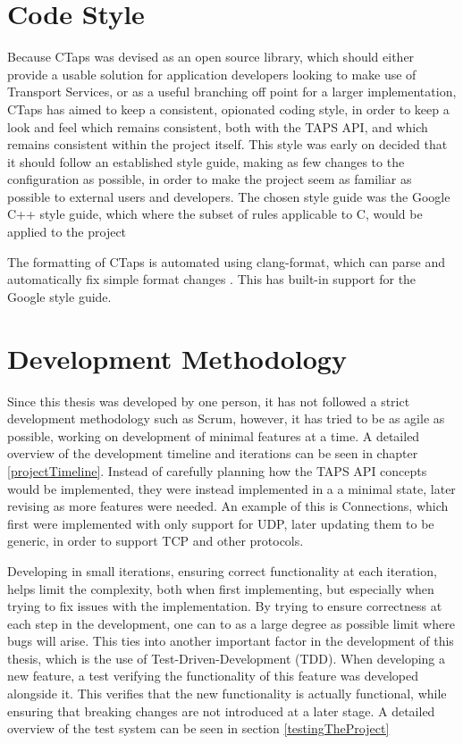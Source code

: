 \section{Code Style}
Because CTaps was devised as an open source library, which
should either provide a usable solution for application
developers looking to make use of Transport Services, or as
a useful branching off point for a larger implementation, CTaps has aimed
to keep a consistent, opionated coding style, in order to keep a look and
feel which remains consistent, both with the TAPS API, and which remains
consistent within the project itself. This style was early on decided that
it should follow an established style guide, making as few changes to the configuration
as possible, in order to make the project seem as familiar as possible to external
users and developers. The chosen style guide was the Google C++ style guide, which
where the subset of rules applicable to C, would be applied to the project \cite{googleGoogleStyleGuide}

The formatting of CTaps is automated using clang-format, which can parse
and automatically fix simple format changes . This has built-in
support for the Google style guide. 

\section{Development Methodology} \label{developmentMethodology}
Since this thesis was developed by one person, it has not
followed a strict development methodology such as Scrum, however,
it has tried to be as agile as possible, working on development of minimal features
at a time. A detailed overview of the development timeline and iterations can be
seen in chapter \ref{projectTimeline}. Instead of carefully planning how the TAPS
API concepts would be implemented, they were instead implemented in a a minimal state,
later revising as more features were needed. An example of this is Connections, which
first were implemented with only support for UDP, later updating them to be generic,
in order to support TCP and other protocols.

Developing in small iterations, ensuring correct functionality at each iteration, helps
limit the complexity, both when first implementing, but especially when trying to fix
issues with the implementation. By trying to ensure correctness at each step in the development,
one can to as a large degree as possible limit where bugs will arise. This ties
into another important factor in the development of this thesis, which is the use of
Test-Driven-Development (TDD). When developing a new feature, a test
verifying the functionality of this feature was developed alongside it.
This verifies that the new functionality is actually functional,
while ensuring that breaking changes are not introduced at a later stage.
A detailed overview of the test system can be seen in section \ref{testingTheProject}


